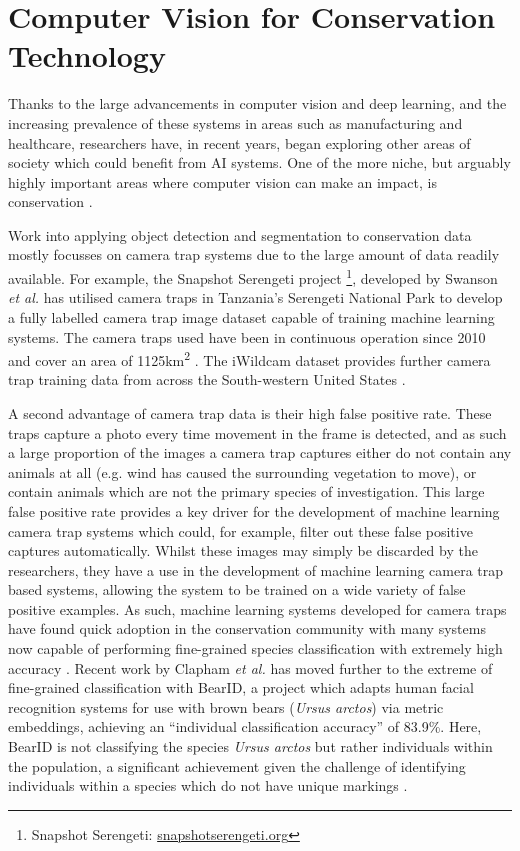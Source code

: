 \section{Computer Vision for Conservation Technology}\label{ch:Background,sec:conTech}

Thanks to the large advancements in computer vision and deep learning, and the increasing prevalence of these systems in areas such as manufacturing and healthcare, researchers have, in recent years, began exploring other areas of society which could benefit from AI systems. One of the more niche, but arguably highly important areas where computer vision can make an impact, is conservation \cite{weinstein_computer_2018}.

Work into applying object detection and segmentation to conservation data mostly focusses on camera trap systems due to the large amount of data readily available. For example, the Snapshot Serengeti project \footnote{Snapshot Serengeti: \href{https://www.snapshotserengeti.org/}{snapshotserengeti.org}}, developed by Swanson \textit{et al.} has utilised camera traps in Tanzania's Serengeti National Park to develop a fully labelled camera trap image dataset capable of training machine learning systems. The camera traps used have been in continuous operation since 2010 and cover an area of 1125km\textsuperscript{2} \cite{swanson_snapshot_2015}. The iWildcam dataset provides further camera trap training data from across the South-western United States \cite{beery_iwildcam_2019}.

 A second advantage of camera trap data is their high false positive rate. These traps capture a photo every time movement in the frame is detected, and as such a large proportion of the images a camera trap captures either do not contain any animals at all (e.g. wind has caused the surrounding vegetation to move), or contain animals which are not the primary species of investigation. This large false positive rate provides a key driver for the development of machine learning camera trap systems which could, for example, filter out these false positive captures automatically. Whilst these images may simply be discarded by the researchers, they have a use in the development of machine learning camera trap based systems, allowing the system to be trained on a wide variety of false positive examples. As such, machine learning systems developed for camera traps have found quick adoption in the conservation community with many systems now capable of performing fine-grained species classification with extremely high accuracy \cite{tabak_machine_2019, norouzzadeh_automatically_2018, willi_identifying_2019, beery_efficient_2019, norouzzadeh_deep_2019}. Recent work by Clapham \textit{et al.} has moved further to the extreme of fine-grained classification with BearID, a project which adapts human facial recognition systems for use with brown bears (\textit{Ursus arctos}) via metric embeddings, achieving an ``individual classification accuracy'' of 83.9\%. Here, BearID is not classifying the species \textit{Ursus arctos} but rather individuals within the population, a significant achievement given the challenge of identifying individuals within a species which do not have unique markings \cite{clapham_automated_2020}.

